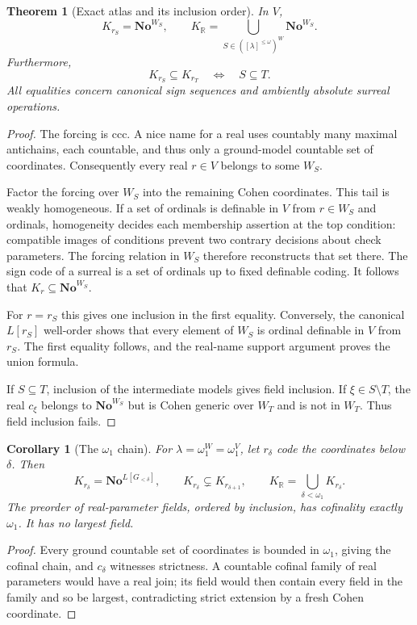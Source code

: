 \documentclass[11pt,a4paper]{article}
\numberwithin{equation}{section}
\newtheorem{theorem}{Theorem}[section]
\newtheorem{corollary}[corollary]{Corollary}
\theoremstyle{definition}
\theoremstyle{remark}
\newcommand{\No}{\mathbf{No}}
\newcommand{\R}{\mathbb R}
\newcommand{\KR}{K_{\R}}
\begin{document}
\begin{theorem}[Exact atlas and its inclusion order]\label{dsn:rp:thm:cohen-atlas}
In $V$,
\[
 K_{r_S}=\No^{W_S},\qquad
 \KR
 =\bigcup_{S\in([\lambda]^{\le\omega})^W}\No^{W_S}.
\]
Furthermore,
\[
 K_{r_S}\subseteq K_{r_T}
 \quad\Longleftrightarrow\quad S\subseteq T.
\]
All equalities concern canonical sign sequences and ambiently absolute
surreal operations.
\end{theorem}

\begin{proof}
The forcing is ccc.  A nice name for a real uses countably many maximal
antichains, each countable, and thus only a ground-model countable set
of coordinates.  Consequently every real $r\in V$ belongs to some
$W_S$.

Factor the forcing over $W_S$ into the remaining Cohen coordinates.
This tail is weakly homogeneous.  If a set of ordinals is definable
in $V$ from $r\in W_S$ and ordinals, homogeneity decides each
membership assertion at the top condition: compatible images of
conditions prevent two contrary decisions about check parameters.
The forcing relation in $W_S$ therefore reconstructs that set there.
The sign code of a surreal is a set of ordinals up to fixed definable
coding.  It follows that
$K_r\subseteq\No^{W_S}$.

For $r=r_S$ this gives one inclusion in the first equality.  Conversely,
the canonical $L[r_S]$ well-order shows that every element of $W_S$
is ordinal definable in $V$ from $r_S$.  The first equality follows,
and the real-name support argument proves the union formula.

If $S\subseteq T$, inclusion of the intermediate models gives field
inclusion.  If $\xi\in S\setminus T$, the real $c_\xi$ belongs to
$\No^{W_S}$ but is Cohen generic over $W_T$ and is not in
$W_T$.  Thus field inclusion fails.
\end{proof}

\begin{corollary}[The $\omega_1$ chain]\label{dsn:rp:cor:cohen-chain}
For $\lambda=\omega_1^W=\omega_1^V$, let $r_\delta$ code the
coordinates below $\delta$.  Then
\[
 K_{r_\delta}=\No^{L[G_{<\delta}]},\qquad
 K_{r_\delta}\subsetneq K_{r_{\delta+1}},\qquad
 \KR=\bigcup_{\delta<\omega_1}K_{r_\delta}.
\]
The preorder of real-parameter fields, ordered by inclusion, has
cofinality exactly $\omega_1$.  It has no largest field.
\end{corollary}

\begin{proof}
Every ground countable set of coordinates is bounded in $\omega_1$,
giving the cofinal chain, and $c_\delta$ witnesses strictness.  A
countable cofinal family of real parameters would have a real join;
its field would then contain every field in the family and so be
largest, contradicting strict extension by a fresh Cohen coordinate.
\end{proof}
\end{document}
